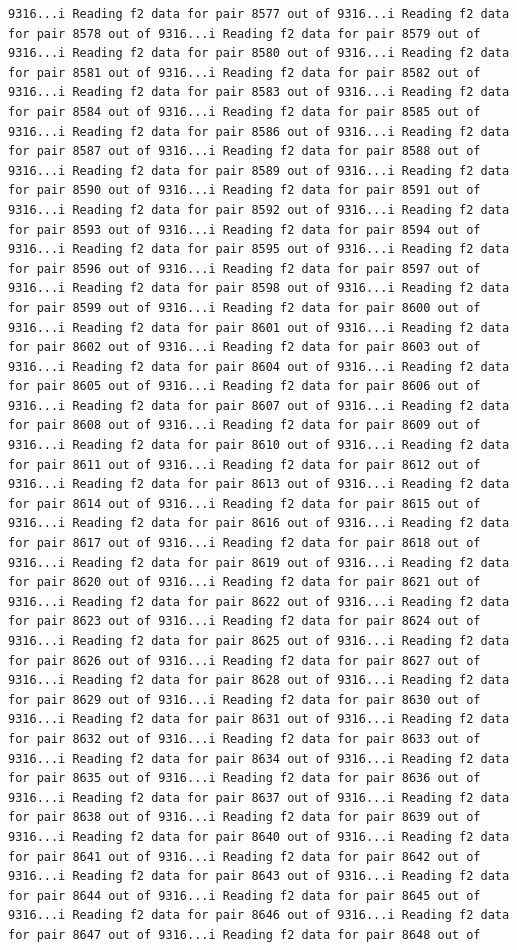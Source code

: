 \documentclass[
]{article}
\begin{document}
\begin{verbatim}
9316...i Reading f2 data for pair 8577 out of 9316...i Reading f2 data for pair 8578 out of 9316...i Reading f2 data for pair 8579 out of 9316...i Reading f2 data for pair 8580 out of 9316...i Reading f2 data for pair 8581 out of 9316...i Reading f2 data for pair 8582 out of 9316...i Reading f2 data for pair 8583 out of 9316...i Reading f2 data for pair 8584 out of 9316...i Reading f2 data for pair 8585 out of 9316...i Reading f2 data for pair 8586 out of 9316...i Reading f2 data for pair 8587 out of 9316...i Reading f2 data for pair 8588 out of 9316...i Reading f2 data for pair 8589 out of 9316...i Reading f2 data for pair 8590 out of 9316...i Reading f2 data for pair 8591 out of 9316...i Reading f2 data for pair 8592 out of 9316...i Reading f2 data for pair 8593 out of 9316...i Reading f2 data for pair 8594 out of 9316...i Reading f2 data for pair 8595 out of 9316...i Reading f2 data for pair 8596 out of 9316...i Reading f2 data for pair 8597 out of 9316...i Reading f2 data for pair 8598 out of 9316...i Reading f2 data for pair 8599 out of 9316...i Reading f2 data for pair 8600 out of 9316...i Reading f2 data for pair 8601 out of 9316...i Reading f2 data for pair 8602 out of 9316...i Reading f2 data for pair 8603 out of 9316...i Reading f2 data for pair 8604 out of 9316...i Reading f2 data for pair 8605 out of 9316...i Reading f2 data for pair 8606 out of 9316...i Reading f2 data for pair 8607 out of 9316...i Reading f2 data for pair 8608 out of 9316...i Reading f2 data for pair 8609 out of 9316...i Reading f2 data for pair 8610 out of 9316...i Reading f2 data for pair 8611 out of 9316...i Reading f2 data for pair 8612 out of 9316...i Reading f2 data for pair 8613 out of 9316...i Reading f2 data for pair 8614 out of 9316...i Reading f2 data for pair 8615 out of 9316...i Reading f2 data for pair 8616 out of 9316...i Reading f2 data for pair 8617 out of 9316...i Reading f2 data for pair 8618 out of 9316...i Reading f2 data for pair 8619 out of 9316...i Reading f2 data for pair 8620 out of 9316...i Reading f2 data for pair 8621 out of 9316...i Reading f2 data for pair 8622 out of 9316...i Reading f2 data for pair 8623 out of 9316...i Reading f2 data for pair 8624 out of 9316...i Reading f2 data for pair 8625 out of 9316...i Reading f2 data for pair 8626 out of 9316...i Reading f2 data for pair 8627 out of 9316...i Reading f2 data for pair 8628 out of 9316...i Reading f2 data for pair 8629 out of 9316...i Reading f2 data for pair 8630 out of 9316...i Reading f2 data for pair 8631 out of 9316...i Reading f2 data for pair 8632 out of 9316...i Reading f2 data for pair 8633 out of 9316...i Reading f2 data for pair 8634 out of 9316...i Reading f2 data for pair 8635 out of 9316...i Reading f2 data for pair 8636 out of 9316...i Reading f2 data for pair 8637 out of 9316...i Reading f2 data for pair 8638 out of 9316...i Reading f2 data for pair 8639 out of 9316...i Reading f2 data for pair 8640 out of 9316...i Reading f2 data for pair 8641 out of 9316...i Reading f2 data for pair 8642 out of 9316...i Reading f2 data for pair 8643 out of 9316...i Reading f2 data for pair 8644 out of 9316...i Reading f2 data for pair 8645 out of 9316...i Reading f2 data for pair 8646 out of 9316...i Reading f2 data for pair 8647 out of 9316...i Reading f2 data for pair 8648 out of 
\end{verbatim}
\end{document}

